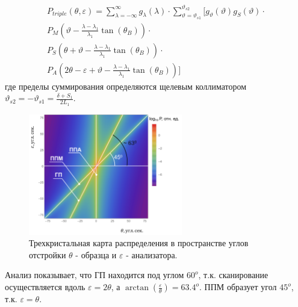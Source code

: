 \begin{eqnarray} \label{eq:doudle_spectra_angle}
  P_{triple}(\theta,\varepsilon) = \sum_{\lambda = -\infty}^{\infty}g_{\lambda}(\lambda)\cdot
  \sum_{\vartheta = \vartheta_{s1}}^{\vartheta_{s2}} \Bigg[ g_{\vartheta}(\vartheta) g_{S}(\vartheta) \cdot \nonumber \\
    P_M \left(\vartheta - \frac{\lambda - \lambda_1}{\lambda_1}\tan(\theta_B) \right) \cdot \nonumber \\
   P_S \left(\theta + \vartheta - \frac{\lambda - \lambda_1}{\lambda_1}\tan(\theta_B)\right)  \cdot  \nonumber \\
   P_A \left(2\theta - \varepsilon + \vartheta - \frac{\lambda - \lambda_1}{\lambda_1}\tan(\theta_B)\right) \Bigg]
 \end{eqnarray}
где пределы суммирования определяются щелевым коллиматором $\vartheta_{s2} = - \vartheta_{s1} = \frac{\delta+S_1}{2L_1}$.
 \begin{figure}[H]
   \centering
   \includegraphics[width=0.6\textwidth]{images/triple_map_direct_space.png}
   \caption{Трехкристальная карта распределения в пространстве углов отстройки $\theta$ - образца и $\varepsilon$
   -  анализатора.}
   \label{ris:triple_map_direct_space}
 \end{figure}

Анализ показывает, что ГП находится под углом $60^o$, т.к. сканирование осуществляется вдоль $\varepsilon = 2 \theta$,
а $ \arctan \left(\frac{\varepsilon}{\theta} \right) = 63.4^o$. ППМ образует угол $45^o$, т.к. $\varepsilon = \theta$.
